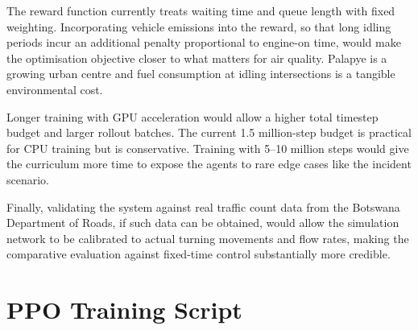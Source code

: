\documentclass[11pt, a4paper]{report}
\begin{document}
The reward function currently treats waiting time and queue length with fixed weighting. Incorporating vehicle emissions into the reward, so that long idling periods incur an additional penalty proportional to engine-on time, would make the optimisation objective closer to what matters for air quality. Palapye is a growing urban centre and fuel consumption at idling intersections is a tangible environmental cost.

Longer training with GPU acceleration would allow a higher total timestep budget and larger rollout batches. The current 1.5 million-step budget is practical for CPU training but is conservative. Training with 5--10 million steps would give the curriculum more time to expose the agents to rare edge cases like the incident scenario.

Finally, validating the system against real traffic count data from the Botswana Department of Roads, if such data can be obtained, would allow the simulation network to be calibrated to actual turning movements and flow rates, making the comparative evaluation against fixed-time control substantially more credible.

\appendix

\chapter{PPO Training Script}
\end{document}
